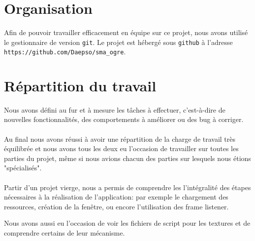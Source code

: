 \section{Organisation}
\paragraph{}Afin de pouvoir travailler efficacement en équipe sur ce projet, nous avons 
utilisé le gestionnaire de version \texttt{git}. Le projet est hébergé sous 
\texttt{github} à l'adresse \verb!https://github.com/Daepso/sma_ogre!. 

\section{Répartition du travail}
\paragraph{}Nous avons défini au fur et à mesure les tâches à effectuer, c'est-à-dire de
nouvelles fonctionnalités, des comportements à améliorer ou des bug à
corriger. 

\paragraph{}Au final nous avons réussi à avoir une répartition de la charge de travail
très équilibrée et nous avons tous les deux eu l'occasion de travailler sur
toutes les parties du projet, même si nous avions chacun des parties sur
lesquels nous étions "spécialisés".

\paragraph{}Partir d'un projet vierge, nous a permis de comprendre les
l'intégralité des étapes nécessaires à la réalisation de l'application:
par exemple le chargement des ressources, création de la fenêtre, ou encore l'utilisation 
des frame listener.

Nous avons aussi eu l'occasion de voir les fichiers de script pour les
textures et de comprendre certains de leur mécanisme. 

